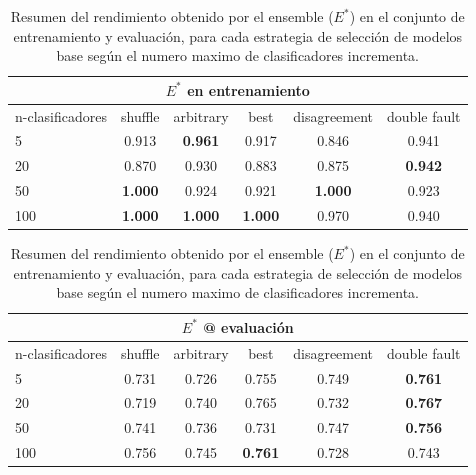 \begin{table}[H]
    \centering
    
    \begin{tabular}{lccccc}
    \toprule
        \multicolumn{6}{c}{$E^*$ en entrenamiento} \\ \midrule
        n-clasificadores & shuffle & arbitrary & best & disagreement & double fault  \\ \midrule \midrule
        5 & 0.913 & {\bf 0.961} & 0.917 & 0.846 & 0.941 \\
        20 & 0.870 & 0.930 & 0.883 & 0.875 & {\bf 0.942} \\
        50 & {\bf 1.000} & 0.924 & 0.921 & {\bf 1.000} & 0.923 \\
        100 & {\bf 1.000} & {\bf 1.000} & {\bf 1.000} & 0.970 & 0.940 \\
    \bottomrule
    \end{tabular}

    \begin{tabular}{lccccc}
    \toprule
        \multicolumn{6}{c}{$E^*$ @ evaluación} \\ \midrule
        n-clasificadores & shuffle & arbitrary & best & disagreement & double fault  \\ \midrule \midrule
        5 & 0.731 & 0.726 & 0.755 & 0.749 & {\bf 0.761} \\
        20 & 0.719 & 0.740 & 0.765 & 0.732 & {\bf 0.767} \\
        50 & 0.741 & 0.736 & 0.731 & 0.747 & {\bf 0.756} \\
        100 & 0.756 & 0.745 & {\bf 0.761} & 0.728 & 0.743 \\
    \bottomrule
    \end{tabular}

    \caption{Resumen del rendimiento obtenido por el ensemble ($E^*$) en el conjunto de entrenamiento y evaluación, para cada estrategia de selección de modelos base según el numero maximo de clasificadores incrementa.}
    \label{table:performance}
\end{table}


